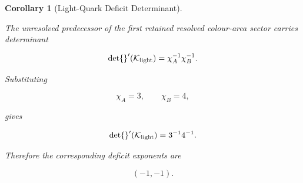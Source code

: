 \documentclass[11pt]{article}
\newtheorem{corollary}[theorem]{Corollary}
\theoremstyle{definition}
\theoremstyle{remark}
\begin{document}
\begin{corollary}[Light-Quark Deficit Determinant]
\label{cor:light_quark_deficit}

The unresolved predecessor of the first retained resolved
colour-area sector carries determinant

\begin{equation}
\det{}'(\mathcal K_{\rm light})
=
\chi_A^{-1}\chi_B^{-1}.
\end{equation}

Substituting

\begin{equation}
\chi_A=3,
\qquad
\chi_B=4,
\end{equation}

gives

\begin{equation}
\det{}'(\mathcal K_{\rm light})
=
3^{-1}4^{-1}.
\end{equation}

Therefore the corresponding deficit exponents are

\begin{equation}
(-1,-1).
\end{equation}

\end{corollary}
\end{document}
